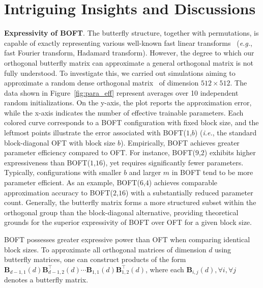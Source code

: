 \section{Intriguing Insights and Discussions}

\textbf{Expressivity of BOFT}. The butterfly structure, together with permutations, is capable of exactly representing various well-known fast linear transforms~\cite{dao2019learning,dao2019kaleidoscope} (\emph{e.g.}, fast Fourier transform, Hadamard transform). However, the degree to which our orthogonal butterfly matrix can approximate a general orthogonal matrix is not fully understood. To investigate this, we carried out simulations aiming to approximate a random dense orthogonal matrix~\cite{anderson1987generation} of dimension $512\times 512$. The data shown in Figure~\ref{fig:para_eff} represent averages over 10 independent random initializations. On the y-axis, the plot reports the approximation error, while the x-axis indicates the number of effective trainable parameters. Each colored curve corresponds to a BOFT configuration with fixed block size, and the leftmost points illustrate the error associated with BOFT($1$,$b$) (\emph{i.e.}, the standard block-diagonal OFT with block size $b$). Empirically, BOFT achieves greater parameter efficiency compared to OFT. For instance, BOFT($9$,$2$) exhibits higher expressiveness than BOFT($1$,$16$), yet requires significantly fewer parameters. Typically, configurations with smaller $b$ and larger $m$ in BOFT tend to be more parameter efficient. As an example, BOFT($6$,$4$) achieves comparable approximation accuracy to BOFT($2$,$16$) with a substantially reduced parameter count. Generally, the butterfly matrix forms a more structured subset within the orthogonal group than the block-diagonal alternative, providing theoretical grounds for the superior expressivity of BOFT over OFT for a given block size.

\begin{theorem}\label{thm:exp_boft}
    BOFT possesses greater expressive power than OFT when comparing identical block sizes. To approximate all orthogonal matrices of dimension $d$ using butterfly matrices, one can construct products of the form $\bm{B}_{d-1,1}(d)\bm{B}^\top_{d-1,2}(d)\cdots\bm{B}_{1,1}(d)\bm{B}^\top_{1,2}(d)$, where each $\bm{B}_{i,j}(d),\forall i,\forall j$ denotes a butterfly matrix.
\end{theorem}

